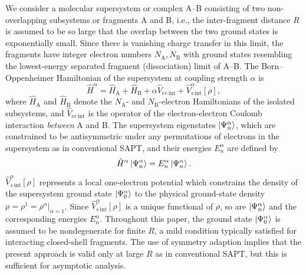 \documentclass[journal=jctcce,manuscript=article]{achemso}
\begin{document}
We consider a molecular supersystem or complex A--B consisting of two
non-overlapping subsystems or fragments A and B, i.e., the  
inter-fragment distance $R$ is assumed to be so large 
that the overlap between the two ground states is exponentially
small. Since there is vanishing charge transfer in this limit, the
fragments have integer electron numbers $N_\text{A}, N_\text{B}$ with
ground states 
resembling the lowest-energy separated fragment (dissociation) limit of A--B.
The Born--Oppenheimer Hamiltonian of the supersystem at coupling strength
$\alpha$ is
\begin{equation}
  \hat{H}^\alpha = \hat{H}_{\text{A}} + \hat{H}_{\text{B}} + \alpha
   \hat{V}_{ee \,\text{int}}  + \hat{V}_{s\,\text{int}}^\alpha[\rho] ,
\end{equation}
where $\hat{H}_{\text{A}}$ and $\hat{H}_{\text{B}}$ denote the
$N_\text{A}$- and $N_\text{B}$-electron Hamiltonians of the isolated
subsystems, and
$\hat{V}_{ee \,\text{int}}$ is the operator of the electron-electron
Coulomb interaction \emph{between} A and
B. The supersystem eigenstates $\ket{\Psi_n^\alpha}$, which are
constrained to be
antisymmetric under any permutations of electrons in the supersystem as
in conventional SAPT,
and their energies $E^\alpha_n$ are defined by
\begin{equation}
  \hat{H}^\alpha \ket{\Psi_n^\alpha} = E^\alpha_n
  \ket{\Psi_n^\alpha}.
\end{equation}
$\hat{V}_{s\,\text{int}}^\alpha[\rho]$ represents a   
local one-electron potential which constrains the density of the 
supersystem ground state $\ket{\Psi^\alpha_0}$ to the physical ground-state
density $\rho = \rho^1 = \left.\rho^\alpha\right|_{\alpha=1}$. Since
$\hat{V}_{s\,\text{int}}^\alpha[\rho]$ is a unique
functional of $\rho$,\cite{PhysRev.136.B864} so are $\ket{\Psi^\alpha_n}$
and the corresponding energies $E^\alpha_n$. Throughout this paper, the
ground state $\ket{\Psi^\alpha_0}$ is assumed to be nondegenerate for
finite $R$, a mild condition typically satisfied for interacting
closed-shell fragments. The use of symmetry adaption implies that the
present approach is valid only at large $R$ as in conventional SAPT,
\cite{doi:10.1063/1.463475} but
this is sufficient for asymptotic analysis.
\end{document}
